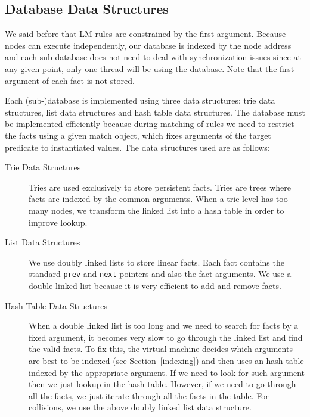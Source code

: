 \subsection{Database Data Structures}\label{sec:database}

We said before that LM rules are constrained by the first argument. Because nodes can execute
independently, our database is indexed by the node address and each sub-database does not
need to deal with synchronization issues since at any given point, only one thread will be using
the database. Note that the first argument of each fact is not stored.

Each (sub-)database is implemented using three data structures: trie data structures, list data structures and hash table data structures.
The database must be implemented efficiently because during matching of rules we need
to restrict the facts using a given match object, which fixes arguments of the target predicate to instantiated values. The data structures used are as follows:

\begin{description}
   \item[Trie Data Structures]

   Tries are used exclusively to store persistent facts.
   Tries are trees where facts are indexed by the common arguments. When a trie level has too many nodes, we
   transform the linked list into a hash table in order to improve lookup.
      
   \item[List Data Structures]
   
   We use doubly linked lists to store linear facts. Each fact contains the standard \texttt{prev} and \texttt{next} pointers
   and also the fact arguments. We use a double linked list because it is very efficient to add and remove facts.
   
   \item[Hash Table Data Structures]
   
   When a double linked list is too long and we need to search for facts by a fixed argument, it becomes very slow to go through the
   linked list and find the valid facts. To fix this, the virtual machine decides which arguments are best to be indexed
   (see Section~\ref{indexing}) and then
   uses an hash table indexed by the appropriate argument. If we need to look for such argument then we just lookup in the hash table. However,
   if we need to go through all the facts, we just iterate through all the facts in the table. For collisions, we use the above doubly linked list data structure.
\end{description}

